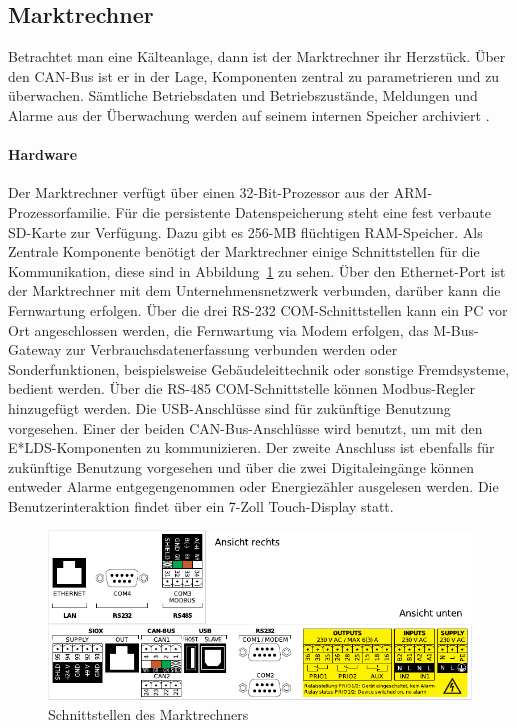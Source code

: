 \documentclass[11pt,a4paper]{report}
\begin{document}
\subsection{Marktrechner} \label{sec:marktrechner} 
Betrachtet man eine Kälteanlage, dann ist der Marktrechner ihr Herzstück. Über den CAN-Bus ist er in der Lage, Komponenten zentral zu parametrieren und zu überwachen. Sämtliche Betriebsdaten und Betriebszustände, Meldungen und Alarme aus der Überwachung werden auf seinem internen Speicher archiviert \cite{elds}.

\paragraph{Hardware} Der Marktrechner verfügt über einen 32-Bit-Prozessor aus der ARM-Prozessorfamilie. Für die persistente Datenspeicherung steht eine fest verbaute SD-Karte zur Verfügung. Dazu gibt es 256-MB flüchtigen RAM-Speicher. Als Zentrale Komponente benötigt der Marktrechner einige Schnittstellen für die Kommunikation, diese sind in Abbildung~\ref{fig:marktrechner_interfaces} zu sehen. Über den Ethernet-Port ist der Marktrechner mit dem Unternehmensnetzwerk verbunden, darüber kann die Fernwartung erfolgen. Über die drei RS-232 COM-Schnittstellen kann ein PC vor Ort angeschlossen werden, die Fernwartung via Modem erfolgen, das M-Bus-Gateway zur Verbrauchsdatenerfassung verbunden werden oder Sonderfunktionen, beispielsweise Gebäudeleittechnik oder sonstige Fremdsysteme, bedient werden. Über die RS-485 COM-Schnittstelle können Modbus-Regler hinzugefügt werden. Die USB-Anschlüsse sind für zukünftige Benutzung vorgesehen. Einer der beiden CAN-Bus-Anschlüsse wird benutzt, um mit den E*LDS-Komponenten zu kommunizieren. Der zweite Anschluss ist ebenfalls für zukünftige Benutzung vorgesehen und über die zwei Digitaleingänge können entweder Alarme entgegengenommen oder Energiezähler ausgelesen werden. Die Benutzerinteraktion findet über ein 7-Zoll Touch-Display statt.

\begin{figure}[htbp]
\centering
\includegraphics[scale=1.1]{images/CI4000_Hardware_Sticker.pdf}
\caption{Schnittstellen des Marktrechners}
\label{fig:marktrechner_interfaces}
\end{figure}
\end{document}
